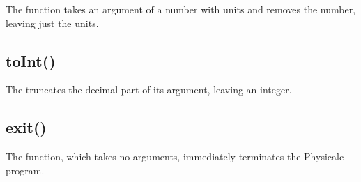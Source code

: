 The  function takes an argument of a number with
units and removes the number, leaving just the units.

\subsection{toInt()}

The  truncates the decimal part of its argument, leaving
an integer.

\subsection{exit()}

The  function, which takes no arguments, immediately
terminates the Physicalc program.
